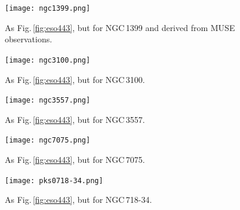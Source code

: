 \documentclass[a4paper,fleqn,usenatbib]{mnras}
\begin{document}
	\begin{figure}
		\centering
		\texttt{[image: ngc1399.png]}
		\caption{As Fig.\,\ref{fig:eso443}, but for NGC\,1399 and derived from MUSE observations.}
		\label{fig:ngc1399}
	\end{figure}

	\begin{figure}
		\centering
		\texttt{[image: ngc3100.png]}
		\caption{As Fig.\,\ref{fig:eso443}, but for NGC\,3100.}
		\label{fig:ngc3100}
	\end{figure}

	\begin{figure}
		\centering
		\texttt{[image: ngc3557.png]}
		\caption{As Fig.\,\ref{fig:eso443}, but for NGC\,3557.}
		\label{fig:ngc3557}
	\end{figure}

	\begin{figure}
		\centering
		\texttt{[image: ngc7075.png]}
		\caption{As Fig.\,\ref{fig:eso443}, but for NGC\,7075.}
		\label{fig:ngc7075}
	\end{figure}

	\begin{figure}
		\centering
		\texttt{[image: pks0718-34.png]}
		\caption{As Fig.\,\ref{fig:eso443}, but for NGC\,718-34.}
		\label{fig:pks718}
	\end{figure}








\bsp	%
\label{lastpage}
\end{document}
